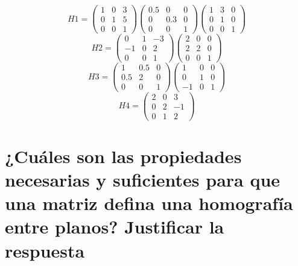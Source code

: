 \begin{equation}
 H1 =
 \begin{pmatrix}
   1 & 0 & 3\\ 0 & 1 & 5\\ 0 & 0 & 1
 \end{pmatrix}
 \begin{pmatrix}
   0.5 & 0 & 0\\ 0 & 0.3 & 0\\ 0 & 0 & 1
 \end{pmatrix}
 \begin{pmatrix}
   1 & 3 & 0\\ 0 & 1 & 0\\ 0 & 0 & 1
 \end{pmatrix}
 \end{equation}
 \begin{equation}
 H2  =
 \begin{pmatrix}
   0 & 1 & -3\\ -1 & 0 & 2\\ 0 & 0 & 1
 \end{pmatrix}
 \begin{pmatrix}
   2 & 0 & 0\\ 2 & 2 & 0\\ 0 & 0 & 1
 \end{pmatrix}
\end{equation}
\begin{equation}
 H3  =
 \begin{pmatrix}
   1 & 0.5 & 0\\ 0.5 & 2 & 0\\ 0 & 0 & 1
 \end{pmatrix}
 \begin{pmatrix}
   1 & 0 & 0\\ 0 & 1 & 0\\ -1 & 0 & 1
 \end{pmatrix}
 \end{equation}
 \begin{equation}
 H4  =
 \begin{pmatrix}
   2 & 0 & 3\\ 0 & 2 & -1\\ 0 & 1 & 2
 \end{pmatrix}
\end{equation}

\section{¿Cuáles son las propiedades necesarias y suficientes para que una matriz
defina una homografía entre planos? Justificar la respuesta}

